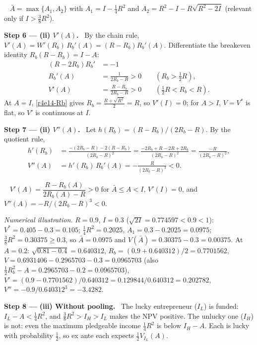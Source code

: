 \documentclass[11pt,a4paper]{article}
\newcommand{\step}[2]{\par\medskip\noindent\textbf{Step #1 --- #2.}~}
\newcommand{\answer}[1]{\par\smallskip\noindent\fbox{\textbf{Answer #1.}}~}
\begin{document}
\answer{(ii-a)} $\bar A=\max\{A_1,A_2\}$ with $A_1=I-\tfrac14R^2$ and
$A_2=R^2-I-R\sqrt{R^2-2I}$ (relevant only if $I>\tfrac38R^2$).

\step{6}{(ii) $V'(A)$} By the chain rule, $V'(A)=W'(R_b)\,R_b'(A)=(R-R_b)R_b'(A)$. Differentiate
the breakeven identity $R_b(R-R_b)=I-A$:
\begin{align}
  (R-2R_b)R_b' &= -1 \nonumber\\
  R_b'(A) &= \frac{1}{2R_b-R} > 0 \qquad(R_b>\tfrac12R), \nonumber\\
  V'(A) &= \frac{R-R_b}{2R_b-R} > 0 \qquad(\tfrac12R<R_b<R). \label{r4e14-Vp}
\end{align}
At $A=I$, \eqref{r4e14-Rb} gives $R_b=\frac{R+\sqrt{R^2}}{2}=R$, so $V'(I)=0$; for $A>I$, $V=V^*$ is
flat, so $V'$ is continuous at $I$.

\step{7}{(ii) $V''(A)$} Let $h(R_b)=(R-R_b)/(2R_b-R)$. By the quotient rule,
\begin{align}
  h'(R_b) &= \frac{-(2R_b-R)-2(R-R_b)}{(2R_b-R)^2} = \frac{-2R_b+R-2R+2R_b}{(2R_b-R)^2} = \frac{-R}{(2R_b-R)^2}, \nonumber\\
  V''(A) &= h'(R_b)\,R_b'(A) = -\frac{R}{(2R_b-R)^3} < 0. \label{r4e14-Vpp}
\end{align}

\answer{(ii-b)} $V'(A)=\dfrac{R-R_b(A)}{2R_b(A)-R}>0$ for $\bar A\le A<I$, $V'(I)=0$, and
$V''(A)=-R/(2R_b-R)^3<0$.

\emph{Numerical illustration.} $R=0.9$, $I=0.3$ ($\sqrt{2I}=0.774597<0.9<1$): $V^*=0.405-0.3=0.105$;
$\tfrac14R^2=0.2025$, $A_1=0.3-0.2025=0.0975$; $\tfrac38R^2=0.30375\ge 0.3$, so $\bar A=0.0975$ and
$V(\bar A)=0.30375-0.3=0.00375$. At $A=0.2$: $\sqrt{0.81-0.4}=0.640312$,
$R_b=(0.9+0.640312)/2=0.7701562$, $V=0.6931406-0.2965703-0.3=0.0965703$ (also
$\tfrac12R_b^2-A=0.2965703-0.2=0.0965703$), $V'=(0.9-0.7701562)/0.640312=0.129844/0.640312=0.202782$,
$V''=-0.9/0.640312^3=-3.4282$.

\step{8}{(iii) Without pooling} The lucky entrepreneur ($I_L$) is funded: $I_L-A<\tfrac14R^2$, and
$\tfrac38R^2>I_H>I_L$ makes the NPV positive. The unlucky one ($I_H$) is not: even the maximum
pledgeable income $\tfrac14R^2$ is below $I_H-A$. Each is lucky with probability $\tfrac12$, so
ex ante each expects $\tfrac12V_{I_L}(A)$.
\end{document}
